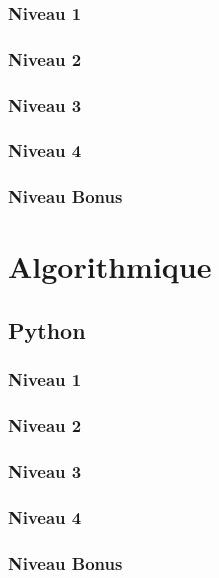 \documentclass[a4paper]{report}
\begin{document}
			\subsection{Niveau 1}
		
			\subsection{Niveau 2}
		
			\subsection{Niveau 3}
			
			\subsection{Niveau 4}
			
			\subsection{Niveau Bonus}
	
	\chapter{Algorithmique}
	
		\section{Python}
		
			\subsection{Niveau 1}
		
			\subsection{Niveau 2}
		
			\subsection{Niveau 3}
			
			\subsection{Niveau 4}
			
			\subsection{Niveau Bonus}
		
\end{document}

